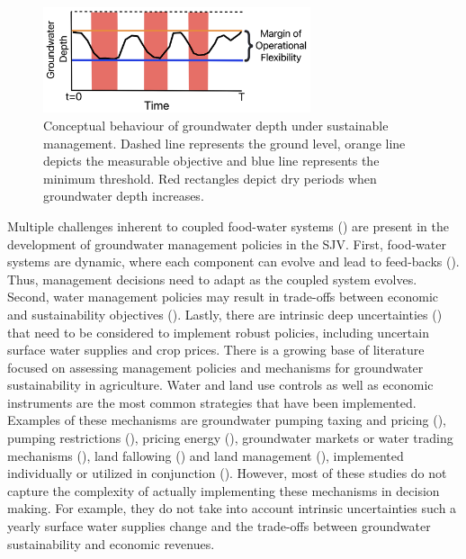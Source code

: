 \documentclass[11pt,a4paper]{article}
\begin{document}
 \begin{figure}[H]
    \centering
    \includegraphics[width=0.7\textwidth]{conceptual_sgma_policy.jpg}
    \caption{Conceptual behaviour of groundwater depth under sustainable management. Dashed line represents the ground level, orange line depicts the measurable objective and blue line represents the minimum threshold. Red rectangles depict dry periods when groundwater depth increases.}
    \label{fig:1}
\end{figure}


Multiple challenges inherent to coupled food-water systems (\cite{polhill_modelling_2016}) are present in the development of groundwater management policies in the SJV. First, food-water systems are dynamic, where each component can evolve and lead to feed-backs (\cite{filatova_regime_2016}). Thus, management decisions need to adapt as the coupled system evolves. Second, water management policies may result in trade-offs between economic and sustainability objectives (\cite{mcdermid_minimizing_2021,stone_economic_2022,torhan_tradeoffs_2022}). Lastly, there are intrinsic deep uncertainties (\cite{stirling_keep_2010}) that need to be considered to implement robust policies, including uncertain surface water supplies and crop prices. There is a growing base of literature focused on assessing management policies and mechanisms for groundwater sustainability in agriculture. Water and land use controls as well as economic instruments are the most common strategies that have been implemented. Examples of these mechanisms are groundwater pumping taxing and pricing  (\cite{madani_exogenous_2013,mulligan_assessing_2014,stone_economic_2022}), pumping restrictions (\cite{young_hydrologic-economic_2021,lan_performance_2021,macewan_hydroeconomic_2017,rodriguez-flores_global_2022}), pricing energy (\cite{hrozencik_impacts_2022}), groundwater markets or water trading mechanisms (\cite{khan_effect_2019,kuwayama_regulation_2013}), land fallowing (\cite{van_schmidt_linkages_2022}) and land management (\cite{bourque_balancing_2019,li_evaluation_2018,bryant_shaping_2020}), implemented individually or utilized in conjunction (\cite{graveline_combining_2020,hrozencik_heterogeneous_2017}). However, most of these studies do not capture the complexity of actually implementing these mechanisms in decision making. For example, they do not take into account intrinsic uncertainties such a yearly surface water supplies change and the trade-offs between groundwater sustainability and economic revenues. 
\end{document}
